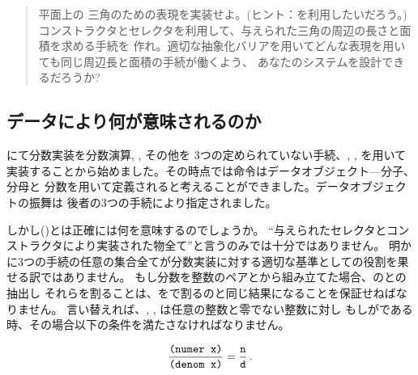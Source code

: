 \begin{quote}
 平面上の
三角のための表現を実装せよ。(ヒント：を利用したいだろう。)
コンストラクタとセレクタを利用して、与えられた三角の周辺の長さと面積を求める手続を
作れ。適切な抽象化バリアを用いてどんな表現を用いても同じ周辺長と面積の手続が働くよう、
あなたのシステムを設計できるだろうか?

\end{quote}

\subsection{データにより何が意味されるのか}
\label{Section 2.1.3}




にて分数実装を分数演算, , その他を
3つの定められていない手続、, , を用いて
実装することから始めました。その時点では命令はデータオブジェクト---分子、分母と
分数を用いて定義されると考えることができました。データオブジェクトの振舞は
後者の3つの手続により指定されました。



しかし()とは正確には何を意味するのでしょうか。
``与えられたセレクタとコンストラクタにより実装された物全て''と言うのみでは十分ではありません。
明かに3つの手続の任意の集合全てが分数実装に対する適切な基準としての役割を果せる訳ではありません。
もし分数を整数のペアとから組み立てた場合、のとの抽出し
それらを割ることは、をで割るのと同じ結果になることを保証せねばなりません。
言い替えれば、, , は任意の整数と零でない整数に対し
もしがである時、その場合以下の条件を満たさなければなりません。
\begin{comment}

\begin{example}
(numer x)    n
--------- = ---
(denom x)    d
\end{example}

\end{comment}
\begin{displaymath}
 {\hbox{\tt(numer x)} \over \hbox{\tt(denom x)}} = {{\tt n} \over {\tt d}}\,.  
\end{displaymath}


